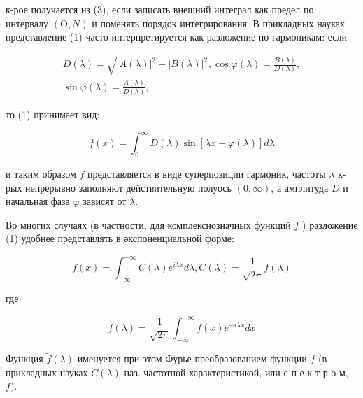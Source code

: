 \documentclass[10pt]{article}
\begin{document}
к-рое получается из (3), если записать внешний интеграл как предел по интервалу $(\mathrm{O}, N)$ и поменять порядок интегрирования. В прикладных науках представление (1) часто интерпретируется как разложение по гармоникам: если



\[

\begin{gathered}

D(\lambda)=\sqrt{|A(\lambda)|^{2}+|B(\lambda)|^{2}}, \cos \varphi(\lambda)=\frac{B(\lambda)}{D(\lambda)}, \\

\sin \varphi(\lambda)=\frac{A(\lambda)}{D(\lambda)},

\end{gathered}

\]



то (1) принимает вид:



\[

f(x)=\int_{0}^{\infty} D(\lambda) \sin [\lambda x+\varphi(\lambda)] d \lambda

\]



и таким образом $f$ представляется в виде суперпозиции гармоник, частоты $\lambda$ к-рых непрерывно заполняют действительную полуось $(0, \infty)$, а амплитуда $D$ и начальная фаза $\varphi$ зависят от $\lambda$.



Во многих случаях (в частности, для комплекснозначных функций $f$ ) разложение (1) удобнее представлять в әкспоненциальной форме:



\[

f(x)=\int_{-\infty}^{+\infty} C(\lambda) e^{i \lambda x} d \lambda, C(\lambda)=\frac{1}{\sqrt{2 \pi}} \tilde{f}(\lambda)

\]



где



\[

\tilde{f}(\lambda)=\frac{1}{\sqrt{2 \pi}} \int_{-\infty}^{+\infty} f(x) e^{-i \lambda x} d x

\]



Функция $\tilde{f}(\lambda)$ именуется при этом Фурье преобразованием функции $f$ (в прикладных науках $C(\lambda)$ наз. частотной характеристикой, или с п е к т р о м, $f)$.
\end{document}
